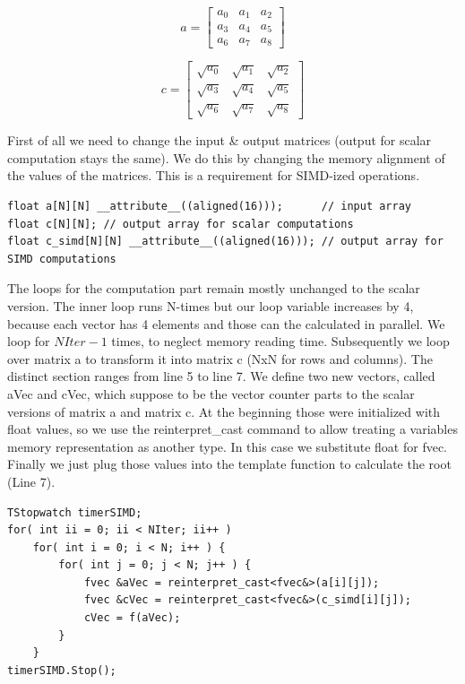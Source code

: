 \documentclass{article}
\begin{document}
\[
a = \begin{bmatrix}
a_0 & a_1 & a_2 \\
a_3 & a_4 & a_5 \\
a_6 & a_7 & a_8
\end{bmatrix}
\]

\[
c = \begin{bmatrix}
\sqrt{a_0} & \sqrt{a_1} & \sqrt{a_2} \\
\sqrt{a_3} & \sqrt{a_4} & \sqrt{a_5} \\
\sqrt{a_6} & \sqrt{a_7} & \sqrt{a_8}
\end{bmatrix}
\]
\newpage

\noindent First of all we need to change the input \& output matrices (output for scalar computation stays the same).
We do this by changing the memory alignment of the values of the matrices.
This is a requirement for SIMD-ized operations.
\begin{lstlisting}[caption=Matrix.cpp]
float a[N][N] __attribute__((aligned(16)));      // input array
float c[N][N]; // output array for scalar computations
float c_simd[N][N] __attribute__((aligned(16))); // output array for SIMD computations
\end{lstlisting}

\noindent The loops for the computation part remain mostly unchanged to the scalar version.
The inner loop runs N-times but our loop variable increases by 4, because each vector has 4 elements and those can the calculated in parallel.
We loop for $NIter - 1$ times, to neglect memory reading time.
Subsequently we loop over matrix a to transform it into matrix c (NxN for rows and columns).
The distinct section ranges from line 5 to line 7. We define two new vectors, called aVec and cVec, which suppose to be the vector counter parts to the scalar versions of matrix a and matrix c.
At the beginning those were initialized with float values, so we use the reinterpret\_cast command to allow treating
a variables memory representation as another type. In this case we substitute float for fvec.
Finally we just plug those values into the template function to calculate the root (Line 7).

\begin{lstlisting}[caption=Matrix.cpp]
TStopwatch timerSIMD;
for( int ii = 0; ii < NIter; ii++ )
    for( int i = 0; i < N; i++ ) {
        for( int j = 0; j < N; j++ ) {
            fvec &aVec = reinterpret_cast<fvec&>(a[i][j]);
            fvec &cVec = reinterpret_cast<fvec&>(c_simd[i][j]);
            cVec = f(aVec);
        }
    }
timerSIMD.Stop();
\end{lstlisting}
\end{document}
